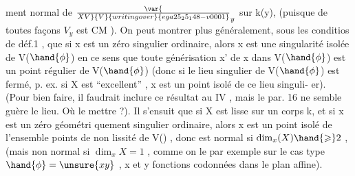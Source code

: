 
ment normal de $\var{\over{X}{V}}{V}{writing over}{ega25_25_148-v0001}_y$ sur k(y), (puisque de toutes façons   $V_y$ est CM ).
On peut montrer  plus généralement, sous les conditios de déf.1 , que si
x est un zéro singulier ordinaire, alors x est une singularité isolée
de V($\hand{\phi}$)  en ce sens que toute générisation  x' de x dans V($\hand{\phi}$) est un
point régulier de V($\hand{\phi}$)  (donc si le lieu singulier de V($\hand{\phi}$) est fermé, p.
ex. si X est ``excellent'' , x est  un point isolé de ce lieu singuli-%
er).  (Pour bien faire, il faudrait inclure ce résultat au 
IV , mais  le par. 16 ne semble guère le lieu. Où le mettre ?).  Il
s'ensuit que si X est lisse sur un corps k, et si x est un zéro géométri%
quement singulier ordinaire, alors  x est un point isolé de l'ensemble
 points de non lissité  de V() , donc est  normal si  $\dim_x(X) \hand{\geqslant} 2$ ,
(mais  non normal si $\dim_x X = 1$ , comme on le   par exemple sur
le cas type $\hand{\phi} = \unsure{xy}$ , x et y fonctions codonnées dans le plan affine).


